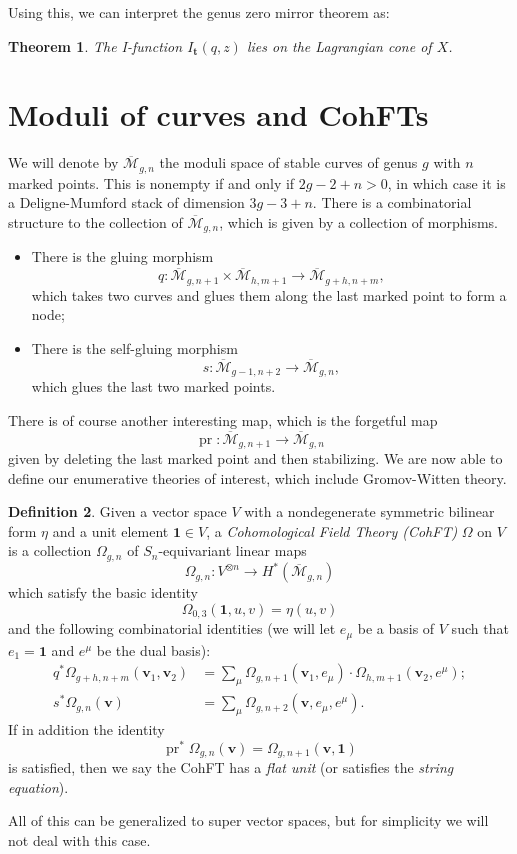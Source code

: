 \documentclass{amsart}
\newtheorem{thm}{Theorem}[section]
\theoremstyle{definition}
\newtheorem{defn}[thm]{Definition}
\theoremstyle{remark}
\theoremstyle{plain}
\theoremstyle{definition}
\theoremstyle{remark}
\newcommand{\Mbar}{\overline{\mathcal{M}}}
\newcommand{\mbf}[1]{\mathbf{#1}}
\newcommand{\bv}{\mbf{v}}
\newcommand{\1}{\mathbf{1}}
\newcommand{\2}{\mathbf{2}}
\newcommand{\3}{\mathbf{3}}
\DeclareMathOperator{\pr}{pr}
\begin{document}
Using this, we can interpret the genus zero mirror theorem as:
\begin{thm}
    The I-function \(I_{\mbf{t}}(q,z)\) lies on the Lagrangian cone of \(X\).
\end{thm}




\section{Moduli of curves and CohFTs}%
\label{sec:Moduli of curves and CohFTs}

We will denote by $\Mbar_{g,n}$ the moduli space of stable curves of genus $g$ with $n$ marked points. This is nonempty if and only if $2g-2+n > 0$, in which case it is a Deligne-Mumford stack of dimension $3g-3+n$. There is a combinatorial structure to the collection of $\Mbar_{g,n}$, which is given by a collection of morphisms.
\begin{itemize}
    \item There is the gluing morphism 
        \[q \colon \Mbar_{g,n+1} \times \Mbar_{h, m+1} \to \Mbar_{g+h,n+m}, \] 
        which takes two curves and glues them along the last marked point to form a node;
    \item There is the self-gluing morphism \[s \colon \Mbar_{g-1,n+2} \to \Mbar_{g,n},\] 
        which glues the last two marked points.
\end{itemize}
There is of course another interesting map, which is the forgetful map
\[ \pr \colon \Mbar_{g,n+1} \to \Mbar_{g,n} \]
given by deleting the last marked point and then stabilizing. We are now able to define our enumerative theories of interest, which include Gromov-Witten theory.

\begin{defn}
    Given a vector space $V$ with a nondegenerate symmetric bilinear form $\eta$ and a unit element $\1 \in V$, a \textit{Cohomological Field Theory (CohFT)} $\Omega$ on $V$ is a collection $\Omega_{g,n}$ of $S_n$-equivariant linear maps
    \[ \Omega_{g,n} \colon V^{\otimes n} \to H^*(\Mbar_{g,n}) \]
    which satisfy the basic identity
    \[ \Omega_{0,3}(\1, u,v) = \eta(u,v) \]
    and the following combinatorial identities (we will let $e_{\mu}$ be a basis of $V$ such that $e_1 = \1$ and $e^{\mu}$ be the dual basis):
    \begin{align*}
        q^* \Omega_{g+h,n+m}(\bv_1, \bv_2) &= \sum_{\mu} \Omega_{g,n+1}(\bv_1, e_{\mu}) \cdot \Omega_{h,m+1}(  \bv_2, e^{\mu} ); \\
        s^* \Omega_{g,n}(\bv) &= \sum_{\mu} \Omega_{g,n+2}(\bv, e_{\mu}, e^{\mu}).
    \end{align*}
    If in addition the identity
    \[ \pr^*\Omega_{g,n}(\bv) = \Omega_{g,n+1}(\bv,\1) \]
    is satisfied, then we say the CohFT has a \textit{flat unit} (or satisfies the \textit{string equation}).
\end{defn}
All of this can be generalized to super vector spaces, but for simplicity we will not deal with this case.
\end{document}

